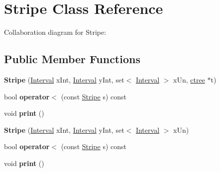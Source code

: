 \hypertarget{classStripe}{}\section{Stripe Class Reference}
\label{classStripe}


Collaboration diagram for Stripe\+:
\subsection*{Public Member Functions}
\begin{DoxyCompactItemize}
\item 
\mbox{\label{classStripe_acf512505e60344dd96539d7da4c162ae}} 
{\bfseries Stripe} (\hyperlink{classInterval}{Interval} x\+Int, \hyperlink{classInterval}{Interval} y\+Int, set$<$ \hyperlink{classInterval}{Interval} $>$ x\+Un, \hyperlink{structctree}{ctree} $\ast$t)
\item 
\mbox{\label{classStripe_ad29dec3d3ad78ad995b646aaa33bf301}} 
bool {\bfseries operator$<$} (const \hyperlink{classStripe}{Stripe} s) const
\item 
\mbox{\label{classStripe_af8f924ca899c00510f396cce954793e3}} 
void {\bfseries print} ()
\item 
\mbox{\label{classStripe_ac7bb0d37787ad666b6e68b45655897ea}} 
{\bfseries Stripe} (\hyperlink{classInterval}{Interval} x\+Int, \hyperlink{classInterval}{Interval} y\+Int, set$<$ \hyperlink{classInterval}{Interval} $>$ x\+Un)
\item 
\mbox{\label{classStripe_ad29dec3d3ad78ad995b646aaa33bf301}} 
bool {\bfseries operator$<$} (const \hyperlink{classStripe}{Stripe} s) const
\item 
\mbox{\label{classStripe_af8f924ca899c00510f396cce954793e3}} 
void {\bfseries print} ()
\end{DoxyCompactItemize}
